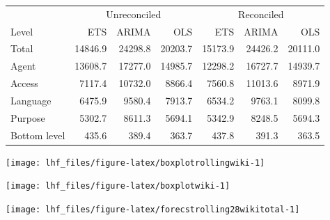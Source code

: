 \documentclass[11pt,a4paper,]{article}
\let\origfigure\figure
\let\endorigfigure\endfigure
\renewenvironment{figure}[1][2] {
    \expandafter\origfigure\expandafter[!htbp]
} {
    \endorigfigure
}
\let\origtable\table
\let\endorigtable\endtable
\renewenvironment{table}[1][2] {
    \expandafter\origtable\expandafter[!htbp]
} {
    \endorigtable
}
\begin{document}
\begin{table}[t]

\caption{\label{tab:wikipediadataresultRMSE}Mean(RMSE) for ETS, ARIMA and OLS with and without reconciliation - Fixed origin - Wikipedia dataset}
\centering
\begin{tabular}{lrrrrrr}
\toprule
\multicolumn{1}{c}{} & \multicolumn{3}{c}{Unreconciled} & \multicolumn{3}{c}{Reconciled} \\
\cmidrule(l{2pt}r{2pt}){2-4} \cmidrule(l{2pt}r{2pt}){5-7}
Level & ETS & ARIMA & OLS & ETS & ARIMA & OLS\\
\midrule
Total & 14846.9 & 24298.8 & 20203.7 & 15173.9 & 24426.2 & 20111.0\\
Agent & 13608.7 & 17277.0 & 14985.7 & 12298.2 & 16727.7 & 14939.7\\
Access & 7117.4 & 10732.0 & 8866.4 & 7560.8 & 11013.6 & 8971.9\\
Language & 6475.9 & 9580.4 & 7913.7 & 6534.2 & 9763.1 & 8099.8\\
Purpose & 5302.7 & 8611.3 & 5694.1 & 5342.9 & 8248.5 & 5694.3\\
Bottom level & 435.6 & 389.4 & 363.7 & 437.8 & 391.3 & 363.5\\
\bottomrule
\end{tabular}
\end{table}

\begin{figure}

{\centering \texttt{[image: lhf\_files/figure-latex/boxplotrollingwiki-1]} 

}

\caption{Box plots of forecast errors for reconciled and unreconciled ETS, ARIMA and OLS methods at each hierarchical level for rolling origin forecasts of Wikipedia pageviews.}\label{fig:boxplotrollingwiki}
\end{figure}

\begin{figure}

{\centering \texttt{[image: lhf\_files/figure-latex/boxplotwiki-1]} 

}

\caption{Box plots of forecast errors for reconciled and unreconciled ETS, ARIMA and OLS methods at each hierarchical level for fixed origin forecasts of Wikipedia pageviews.}\label{fig:boxplotwiki}
\end{figure}

\begin{figure}

{\centering \texttt{[image: lhf\_files/figure-latex/forecstrolling28wikitotal-1]} 

}

\caption{The actual test set for the 'Total' series compared to the forecasts from reconciled and unreconciled ETS, ARIMA and OLS methods for rolling and fixed origin forecasts of Wikipedia pageviews.}\label{fig:forecstrolling28wikitotal}
\end{figure}
\end{document}

